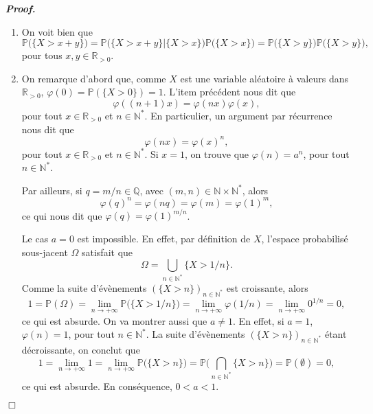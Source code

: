 \documentclass[11pt,a4paper]{article}
\newcommand{\NN}{\mathbb{N}}
\newcommand{\RR}{\mathbb{R}}
\newenvironment{preuve}[1][]
{\vskip 2mm  \noindent\emph{\bf Proof#1. }}{$\Box$ \vskip 2mm}
\newcommand{\Q}{\mathbb{Q}}
\begin{document}
		\begin{preuve} 
			\begin{enumerate}
				\item On voit bien que 
				\[     \mathbb{P}\big(\{X>x+y\}\big) = \mathbb{P}\big(\{X>x+y\} | \{X>x\}\big)\mathbb{P}\big(\{X>x\}\big)= \mathbb{P}\big(\{X>y\}\big)\mathbb{P}\big(\{X>y\}\big),     \]
				pour tous $x,y \in \RR_{> 0}$.  
				
				\item On remarque d'abord que, comme $X$ est une variable aléatoire à valeurs dans $\RR_{> 0}$, 
				$\varphi(0) = \mathbb{P}(\{ X > 0 \}) = 1$. 
				L'item précédent nous dit que 
				\begin{equation}
				\label{eq:rec}  
				\varphi((n+1)x) = \varphi(nx) \varphi(x), 
				\end{equation}   
				pour tout $x \in \RR_{>0}$ et $n \in \NN^{*}$. 
				En particulier, un argument par récurrence nous dit que 
				\begin{equation}
				\label{eq:rec2}  
				\varphi(nx) = \varphi(x)^{n},  
				\end{equation}   
				pour tout $x \in \RR_{>0}$ et $n \in \NN^{*}$. 
				Si $x = 1$, on trouve que $\varphi(n)=a^n$, pour tout $n\in\NN^{*}$. 
				
				Par ailleurs, si $q = m/n \in \Q$, avec $(m, n) \in \NN \times \NN^{*}$, alors 
				\[     \varphi(q)^{n} = \varphi(n q) = \varphi(m) = \varphi(1)^{m},     \]
				ce qui nous dit que $\varphi(q) = \varphi(1)^{m/n}$. 
				
				Le cas $a = 0$ est impossible. 
				En effet, par définition de $X$, l'espace probabilisé sous-jacent $\Omega$ satisfait que 
				\[     \Omega = \bigcup_{n \in  \NN^{*}} \{ X > 1/n \}.     \] 
				Comme la suite d'évènements $(\{ X > n \})_{n \in  \NN^{*}}$ est croissante, alors
				\[    1 = \mathbb{P}(\Omega) = \underset{n \rightarrow + \infty}{\lim} \mathbb{P}\bigg(\{ X > 1/n \} \bigg) 
				= \underset{n \rightarrow + \infty}{\lim} \varphi(1/n) = \underset{n \rightarrow + \infty}{\lim} 0^{1/n} = 0,     \]
				ce qui est absurde. 
				On va montrer aussi que $a \neq 1$. 
				En effet, si $a = 1$, $\varphi(n)=1$, pour tout $n\in\NN^{*}$. 
				La suite d'évènements $(\{ X > n \})_{n \in  \NN^{*}}$ étant décroissante, on conclut que
				\[    1 = \underset{n \rightarrow + \infty}{\lim} 1 = \underset{n \rightarrow + \infty}{\lim} \mathbb{P}\big( \{ X > n \} \big) = \mathbb{P}\bigg(\bigcap_{n \in \NN^{*}} \{ X > n \} \bigg) = \mathbb{P}(\emptyset) = 0,     \]
				ce qui est absurde. 
				En conséquence, $0 < a < 1$. 
				

\end{enumerate}
\end{preuve}
\end{document}

